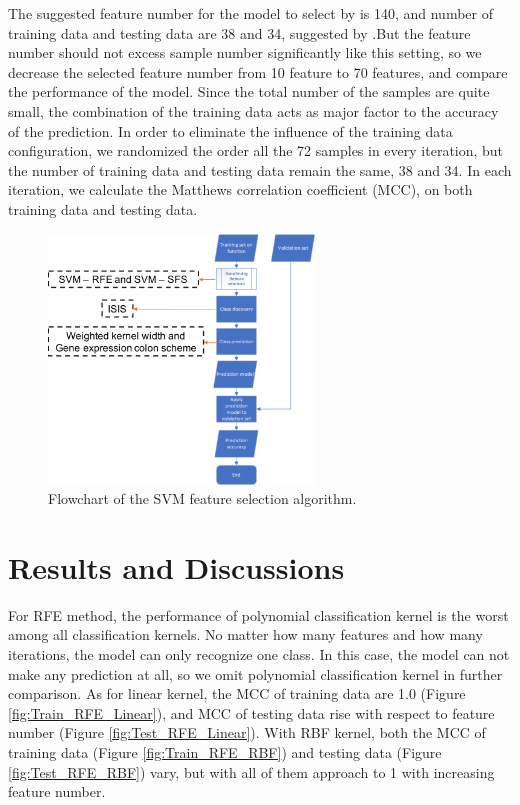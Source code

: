 \documentclass[a4paper,twocolumn]{article} %
\begin{document}
    The suggested feature number for the model to select by \cite{Bhat2017EvaluatingSA} is 140, and number of training data and testing data are 38 and 34, suggested by \cite{Golub531}.But the feature number should not excess sample number significantly like this setting, so we decrease the selected feature number from 10 feature to 70 features, and compare the performance of the model. Since the total number of the samples are quite small, the combination of the training data acts as major factor to the accuracy of the prediction. In order to eliminate the influence of the training data configuration, we randomized the order all the 72 samples in every iteration, but the number of training data and testing data remain the same, 38 and 34. In each iteration, we calculate the Matthews correlation coefficient (MCC), on both training data and testing data.
    
    \begin{figure}[h]
		\begin{center}
			\includegraphics[width=200pt]{FSA_flowchart.pdf}
			\caption{Flowchart of the SVM feature selection algorithm.}
			\label{fig:Flow}
		\end{center}
	\end{figure}

	\section*{Results and Discussions}
	\label{sec:res}  
	
	For RFE method, the performance of polynomial classification kernel is the worst among all classification kernels. No matter how many features and how many iterations, the model can only recognize one class. In this case, the model can not make any prediction at all, so we omit polynomial classification kernel in further comparison. As for linear kernel, the MCC of training data are 1.0 (Figure \ref{fig:Train_RFE_Linear}), and MCC of testing data rise with respect to feature number (Figure \ref{fig:Test_RFE_Linear}). With RBF kernel, both the MCC of training data (Figure \ref{fig:Train_RFE_RBF}) and testing data (Figure \ref{fig:Test_RFE_RBF}) vary, but with all of them approach to 1 with increasing feature number.\newline
	
\end{document}
